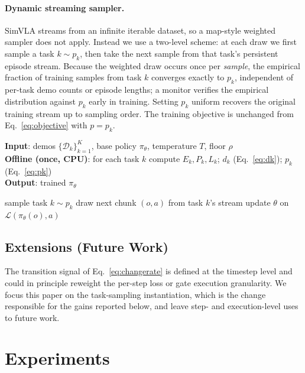 \documentclass[letterpaper]{article} %
\newcommand{\tds}{TDS}
\newcommand{\dk}{d_{k}}
\newcommand{\pk}{p_{k}}
\begin{document}
\paragraph{Dynamic streaming sampler.}
SimVLA streams from an infinite iterable dataset, so a map-style weighted sampler does not apply. Instead we use a two-level scheme: at each draw we first sample a task $k\sim\pk$, then take the next sample from that task's persistent episode stream. Because the weighted draw occurs once per \emph{sample}, the empirical fraction of training samples from task $k$ converges exactly to $\pk$, independent of per-task demo counts or episode lengths; a monitor verifies the empirical distribution against $\pk$ early in training. Setting $\pk$ uniform recovers the original training stream up to sampling order. The training objective is unchanged from Eq.~\eqref{eq:objective} with $p=\pk$.

\begin{algorithm}[tb]
\caption{Transition-Aware Dynamic Sampling (\tds{})}
\label{alg:tds}
\textbf{Input}: demos $\{\mathcal{D}_k\}_{k=1}^{K}$, base policy $\pi_\theta$, temperature $T$, floor $\rho$\\
\textbf{Offline (once, CPU)}: for each task $k$ compute $E_k,P_k,L_k$; $\dk$ (Eq.~\ref{eq:dk}); $\pk$ (Eq.~\ref{eq:pk})\\
\textbf{Output}: trained $\pi_\theta$
\begin{algorithmic}[1]
\STATE sample task $k\sim\pk$
\STATE draw next chunk $(o,a)$ from task $k$'s stream
\STATE update $\theta$ on $\mathcal{L}(\pi_\theta(o),a)$
\ENDWHILE
\end{algorithmic}
\end{algorithm}

\subsection{Extensions (Future Work)}
The transition signal of Eq.~\eqref{eq:changerate} is defined at the timestep level and could in principle reweight the per-step loss or gate execution granularity. We focus this paper on the task-sampling instantiation, which is the change responsible for the gains reported below, and leave step- and execution-level uses to future work.

\section{Experiments}
\end{document}
